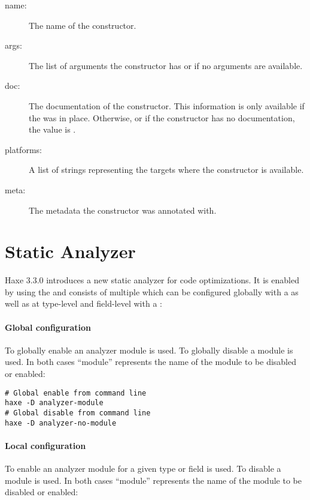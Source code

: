 \begin{description}
    \item[name:] The name of the constructor.
    \item[args:] The list of arguments the constructor has or  if no arguments are available.
    \item[doc:] The documentation of the constructor. This information is only available if the   was in place. Otherwise, or if the constructor has no documentation, the value is .
    \item[platforms:] A list of strings representing the targets where the constructor is available.
    \item[meta:] The metadata the constructor was annotated with.
\end{description}



\section{Static Analyzer}
\label{cr-static-analyzer}

Haxe 3.3.0 introduces a new static analyzer for code optimizations. It is enabled by using the   and consists of multiple  which can be configured globally with a  as well as at type-level and field-level with a :

\paragraph{Global configuration}
\label{cr-static-analyzer-global-configuration}

To globally enable an analyzer module  is used. To globally disable a module  is used. In both cases ``module'' represents the name of the module to be disabled or enabled:

\begin{lstlisting}
# Global enable from command line
haxe -D analyzer-module
# Global disable from command line
haxe -D analyzer-no-module
\end{lstlisting}

\paragraph{Local configuration}
\label{cr-static-analyzer-local-configuration}
To enable an analyzer module for a given type or field  is used. To disable a module  is used. In both cases ``module'' represents the name of the module to be disabled or enabled:

